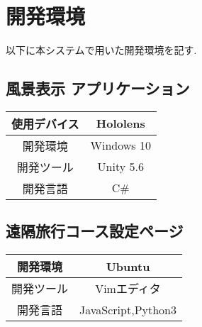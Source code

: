 \section{開発環境}
以下に本システムで用いた開発環境を記す.

\subsection{風景表示 アプリケーション}
\begin{table}[htb]
  \begin{tabular}{|c|c|} \hline
    使用デバイス & Hololens \\ \hline
    開発環境 & Windows 10 \\ \hline
    開発ツール & Unity 5.6 \\ \hline
    開発言語 & C\# \\ \hline
  \end{tabular}
\end{table}

\subsection{遠隔旅行コース設定ページ}
\begin{table}[htb]
  \begin{tabular}{|c|c|} \hline
    開発環境 &  Ubuntu \\ \hline
    開発ツール & Vimエディタ \\ \hline
    開発言語 & JavaScript,Python3 \\ \hline
  \end{tabular}
\end{table}
